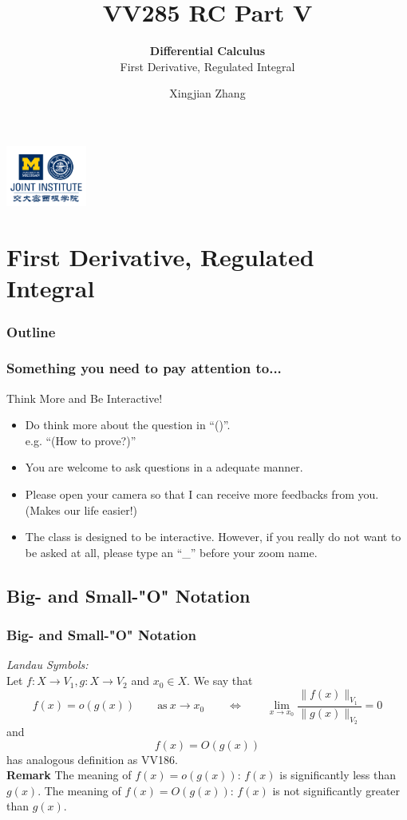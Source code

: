 \documentclass[12pt, t]{beamer}
\title{VV285 RC Part V}
\subtitle{\textbf{Differential Calculus}\\\large First Derivative, Regulated Integral}
\institute[UM-SJTU JI]{Univerity of Michigan-Shanghai Jiao Tong University Joint Institute}
\author{Xingjian Zhang}
\renewcommand{\emph}[1]{{\color{Turquoise3}\textsl{#1}}}
\newcommand{\nullspace}{~\\[15pt]}
\begin{document}
\begin{frame}
    \titlepage
    \begin{center}
        \includegraphics[height=2cm]{logo2.png}
    \end{center}
\end{frame}

\section{First Derivative, Regulated Integral}
\begin{frame}
    \frametitle{Outline}
    \begin{spacing}{1.5}
        \tableofcontents[currentsubsection,hideothersubsections,sectionstyle=hide]
    \end{spacing}
\end{frame}

\begin{frame}
    \frametitle{Something you need to pay attention to...}
    Think More and Be Interactive!
    \begin{itemize}
        \item Do think more about the question in ``()''. \\e.g. ``(How to prove?)''
        \item You are welcome to ask questions in a adequate manner.
        \item Please open your camera so that I can receive more feedbacks from you. (Makes our life easier!) 
        \item The class is designed to be interactive. However, if you really do not want to be asked at all, please type an ``\_'' before your zoom name.
    \end{itemize}
\end{frame}

\subsection{Big- and Small-"O" Notation}
\begin{frame}
    \frametitle{Big- and Small-"O" Notation}
    \emph{Landau Symbols:}
    \nullspace
    Let $f:X\to V_1,g:X\to V_2$ and $x_0\in X$. We say that
    \[f(x)=o(g(x))\qquad\text{as}~x\to x_0\qquad\Leftrightarrow\qquad\lim_{x\to x_0}\frac{\|f(x)\|_{V_1}}{\|g(x)\|_{V_2}}=0\]
    and
    \[f(x)=O(g(x))\] has analogous definition as VV186.
    \nullspace
    \textbf{Remark} The meaning of $f(x)=o(g(x))$: $f(x)$ is significantly less than $g(x)$.
    The meaning of $f(x)=O(g(x))$: $f(x)$ is not significantly greater than $g(x)$.
\end{frame}
\end{document}
